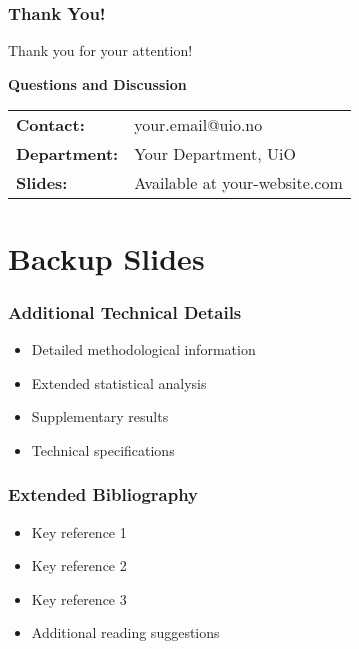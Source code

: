 \begin{frame}
    \frametitle{Thank You!}
    \centering
    \Large Thank you for your attention!
    
    \vspace{2em}
    \normalsize
    \textbf{Questions and Discussion}
    
    \vspace{2em}
    \small
    \begin{tabular}{ll}
        \textbf{Contact:} & your.email@uio.no \\
        \textbf{Department:} & Your Department, UiO \\
        \textbf{Slides:} & Available at your-website.com \\
    \end{tabular}
\end{frame}

\appendix
\section*{Backup Slides}

\begin{frame}
    \frametitle{Additional Technical Details}
    \begin{itemize}
        \item Detailed methodological information
        \item Extended statistical analysis
        \item Supplementary results
        \item Technical specifications
    \end{itemize}
\end{frame}

\begin{frame}
    \frametitle{Extended Bibliography}
    \begin{itemize}
        \item Key reference 1
        \item Key reference 2
        \item Key reference 3
        \item Additional reading suggestions
    \end{itemize}
\end{frame}



